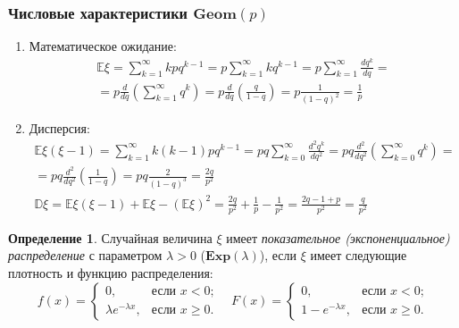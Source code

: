 \documentclass[oneside,final,14pt]{extreport}
\theoremstyle{plain}
\theoremstyle{definition}
\newtheorem*{defn}{Определение}
\theoremstyle{named}
\begin{document}
\subsubsection{Числовые характеристики $\mathbf{Geom}(p)$}
\begin{enumerate}
    \item Математическое ожидание:
    \begin{multline*}
        \mathbb{E} \xi=\sum\limits_{k=1}^{\infty} k p q^{k-1}=p \sum\limits_{k=1}^{\infty} k q^{k-1}=p \sum\limits_{k=1}^{\infty} \frac{d q^{k}}{d q} = \\
        = p \frac{d}{d q}\left(\sum\limits_{k=1}^{\infty} q^{k}\right)=p \frac{d}{d q}\left(\frac{q}{1-q}\right)=p \frac{1}{(1-q)^{2}}=\frac{1}{p}
    \end{multline*}
    \item Дисперсия:
    \begin{multline*}
        \mathbb{E} \xi(\xi-1)=\sum\limits_{k=1}^{\infty} k(k-1) p q^{k-1}=p q \sum\limits_{k=0}^{\infty} \frac{d^{2} q^{k}}{d q^{2}} =p q \frac{d^{2}}{d q^{2}}\left(\sum\limits_{k=0}^{\infty} q^{k}\right) = \\
        =p q \frac{d^{2}}{d q^{2}}\left(\frac{1}{1-q}\right)=p q \frac{2}{(1-q)^{3}}=\frac{2 q}{p^{2}} \\
        \mathbb{D} \xi=\mathbb{E} \xi(\xi-1)+\mathbb{E} \xi-(\mathbb{E} \xi)^{2}=\frac{2 q}{p^{2}}+\frac{1}{p}-\frac{1}{p^{2}}=\frac{2 q-1+p}{p^{2}}=\frac{q}{p^{2}}
    \end{multline*}
\end{enumerate}

\begin{defn}
    Случайная величина $\xi$ имеет {\it показательное (экспоненциальное) распределение} с параметром $\lambda > 0$ ($\mathbf{Exp}(\lambda)$), если $\xi$ имеет следующие плотность и функцию распределения:
    \begin{equation*}
        f(x) = 
        \begin{cases}
            0, & \text{если $x < 0$;} \\
            \lambda e^{-\lambda x}, & \text{если $x \geqslant 0$.}
        \end{cases}
        \quad 
        F(x) = 
        \begin{cases}
            0, & \text{если $x < 0$;} \\
            1 - e^{-\lambda x}, & \text{если $x \geqslant 0$.}
        \end{cases}
    \end{equation*}
\end{defn}
\end{document}
